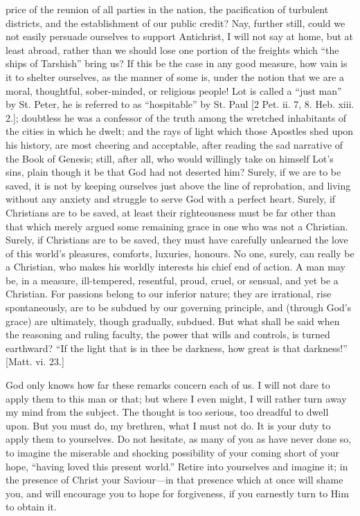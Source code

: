 price of the reunion of all parties in the nation, the pacification of
turbulent districts, and the establishment of our public credit? Nay,
further still, could we not easily persuade ourselves to support
Antichrist, I will not say at home, but at least abroad, rather than
we should lose one portion of the freights which ``the ships of
Tarshish'' bring us? If this be the case in any good measure, how
vain is it to shelter ourselves, as the manner of some is, under the
notion that we are a moral, thoughtful, sober-minded, or religious
people! Lot is called a ``just man'' by St. Peter, he is
referred to as ``hospitable'' by St. Paul [2 Pet. ii. 7, 8.
Heb. xiii. 2.]; doubtless he was a confessor of the truth among the
wretched inhabitants of the cities in which he dwelt; and the rays of
light which those Apostles shed upon his history, are most cheering
and acceptable, after reading the sad narrative of the Book of
Genesis; still, after all, who would willingly take on himself Lot's
sins, plain though it be that God had not deserted him? Surely, if we
are to be saved, it is not by keeping ourselves just above the line of
reprobation, and living without any anxiety and struggle to serve God
with a perfect heart. Surely, if Christians are to be saved, at least
their righteousness must be far other than that which merely argued
some remaining grace in one who was not a Christian. Surely, if
Christians are to be saved, they must have carefully unlearned the
love of this world's pleasures, comforts, luxuries, honours. No one,
surely, can really be a Christian, who makes his worldly interests his
chief end of action. A man may be, in a measure, ill-tempered,
resentful, proud, cruel, or sensual, and yet be a Christian. For
passions belong to our inferior nature; they are irrational, rise
spontaneously, are to be subdued by our governing principle, and
(through God's grace) are ultimately, though gradually, subdued. But
what shall be said when the reasoning and ruling faculty, the power
that wills and controls, is turned earthward? ``If the light that
is in thee be darkness, how great is that darkness!'' [Matt. vi.
23.]

God only knows how far these remarks concern each of us. I will not
dare to apply them to this man or that; but where I even might, I will
rather turn away my mind from the subject. The thought is too serious,
too dreadful to dwell upon. But you must do, my brethren, what I must
not do. It is your duty to apply them to yourselves. Do not hesitate,
as many of you as have never done so, to imagine the miserable and
shocking possibility of your coming short of your hope, ``having
loved this present world.'' Retire into yourselves and imagine it;
in the presence of Christ your Saviour—in that presence which at
once will shame you, and will encourage you to hope for forgiveness,
if you earnestly turn to Him to obtain it.

